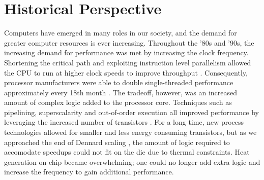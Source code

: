 \section{Historical Perspective}

Computers have emerged in many roles in our society, and the demand for greater
computer resources is ever increasing. Throughout the '80s and '90s, the
increasing demand for performance was met by increasing the clock frequency.
Shortening the critical path and exploiting instruction level parallelism
allowed the CPU to run at higher clock speeds to improve throughput
\cite{tanenbaum1984structured}. Consequently, processor manufacturers were able
to double single-threaded performance approximately every 18th month
\cite{moore1965cramming}. The tradeoff, however, was an increased amount of
complex logic added to the processor core. Techniques such as pipelining,
superscalarity and out-of-order execution all improved performance by leveraging
the increased number of transistors \cite{patterson}. For a long time, new
process technologies allowed for smaller and less energy consuming transistors,
but as we approached the end of Dennard scaling
\cite{dennard1974design,esmaeilzadeh2011dark}, the amount of logic required to
accomodate speedups could not fit on the die due to thermal constraints. Heat
generation on-chip became overwhelming; one could no longer add extra logic and
increase the frequency to gain additional performance.

